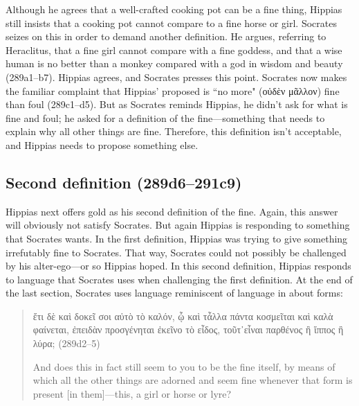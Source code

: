 \documentclass[11pt]{article}
\begin{document}
Although he agrees that a well-crafted cooking pot can be a fine thing,
Hippias still insists that a cooking pot cannot compare to a fine horse or
girl.  Socrates seizes on this in order to demand another definition.  He
argues, referring to Heraclitus, that a fine girl cannot compare with
a fine goddess, and that a wise human is no better than a monkey compared
with a god in wisdom and beauty (289a1--b7).  Hippias agrees, and Socrates
presses this point.  Socrates now makes the familiar complaint that
Hippias' proposed  is ``no more" ({\g οὐδὲν μᾶλλον})
fine than foul (289c1--d5).  But as Socrates reminds Hippias, he didn't ask
for what is fine and foul; he asked for a definition of the
fine---something that needs to explain why all other things are fine.
Therefore, this definition isn't acceptable, and Hippias needs to propose
something else.


\subsection{Second definition (289d6--291c9)}

Hippias next offers gold as his second definition of the fine.  Again, this
answer will obviously not satisfy Socrates.  But again Hippias is
responding to something that Socrates wants.  In the first definition,
Hippias was trying to give something irrefutably fine to Socrates.  That
way, Socrates could not possibly be challenged by his alter-ego---or so
Hippias hoped.  In this second definition, Hippias responds to language
that Socrates uses when challenging the first definition. At the end of the
last section, Socrates uses language reminiscent of language in
 about forms:

\begin{quote}

    {\g
    ἔτι δὲ καὶ δοκεῖ σοι αὐτὸ τὸ καλόν, ᾧ καὶ τἆλλα πάντα κοσμεῖται καὶ
    καλὰ φαίνεται, ἐπειδὰν προσγένηται ἐκεῖνο τὸ εἶδος, τοῦτ᾽εἶναι παρθένος
    ἢ ἵππος ἢ λύρα;
    } (289d2--5)

    And does this in fact still seem to you to be the fine itself, by means
    of which all the other things are adorned and seem fine whenever that
    form is present [in them]---this, a girl or horse or lyre?

\end{quote}
\end{document}
